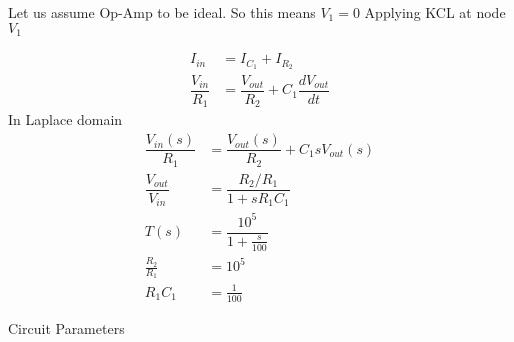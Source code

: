 \begin{enumerate}[label=\thesection.\arabic*.,ref=\thesection.\theenumi]
Let us assume Op-Amp to be ideal. So this means $V_{1}=0$
Applying KCL at node $V_{1}$

\begin{align}
I_{in} &= I_{C_{1}} + I_{R_{2}}
\\
\dfrac{V_{in}}{R_{1}} &= \dfrac{V_{out}}{R_{2}} + C_{1}\dfrac{dV_{out}}{dt}
\end{align}
In Laplace domain
\begin{align}
\dfrac{V_{in}(s)}{R_{1}} &= \dfrac{V_{out}(s)}{R_{2}} + C_{1}sV_{out}(s)
\\
\dfrac{V_{out}}{V_{in}} &= \dfrac{R_{2}/R_{1}}{1+sR_{1}C_{1}}
\\
T(s) &= \dfrac{10^{5}}{1+\frac{s}{100}}
\\
\frac{R_{2}}{R_{1}} &= 10^{5}
\\
R_{1}C_{1} &= \frac{1}{100}
\end{align}


\begin{table}[!ht]
\centering

\caption{Circuit Parameters}
\label{table:ee18btech11001_params2}
\end{table}


\end{enumerate}